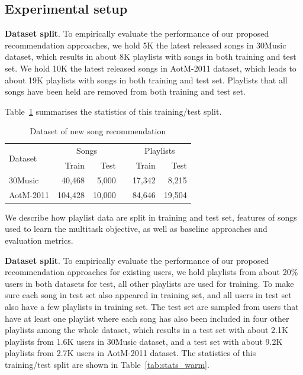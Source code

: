 
\subsection{Experimental setup}

{\bf Dataset split}.
To empirically evaluate the performance of our proposed recommendation approaches,
we hold 5K the latest released songs in 30Music dataset, which results in about 8K playlists with songs
in both training and test set.
We hold 10K the latest released songs in AotM-2011 dataset, which leads to about 19K playlists with songs
in both training and test set.
Playlists that all songs have been held are removed from both training and test set.

Table~\ref{tab:stats_nsr} summarises the statistics of this training/test split.

\begin{table}[!h]
\centering
\caption{Dataset of new song recommendation}
\label{tab:stats_nsr}
\begin{tabular}{lrrcrr}
\toprule
\multirow{2}{*}{Dataset}  & \multicolumn{2}{c}{Songs} && \multicolumn{2}{c}{Playlists} \\ \cmidrule{2-3} \cmidrule{5-6}
                          & Train & Test && Train & Test \\
\midrule
30Music   & 40,468  & 5,000  && 17,342  & 8,215 \\
AotM-2011 & 104,428 & 10,000 && 84,646  & 19,504 \\
\bottomrule
\end{tabular}
\end{table}




We describe how playlist data are split in training and test set,
features of songs used to learn the multitask objective, as well as
baseline approaches and evaluation metrics.

{\bf Dataset split}.
To empirically evaluate the performance of our proposed recommendation approaches for existing users,
we hold playlists from about 20\% users in both datasets for test,
all other playlists are used for training.
To make sure each song in test set also appeared in training set,
and all users in test set also have a few playlists in training set.
The test set are sampled from users that have at least one playlist where each song has also been
included in four other playlists among the whole dataset,
which results in a test set with about 2.1K playlists from 1.6K users in 30Music dataset,
and a test set with about 9.2K playlists from 2.7K users in AotM-2011 dataset.
The statistics of this training/test split are shown in Table~\ref{tab:stats_warm}.

